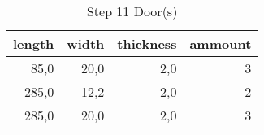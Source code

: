 \begin{table}[h!]
\centering
\caption{Step 11 Door(s)}
\begin{tabular}{rrrr}
\toprule
 length &  width &  thickness &  ammount \\
\midrule
   85,0 &   20,0 &        2,0 &        3 \\
  285,0 &   12,2 &        2,0 &        2 \\
  285,0 &   20,0 &        2,0 &        3 \\
\bottomrule
\end{tabular}
\end{table}
